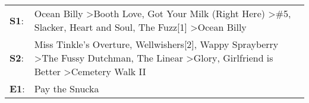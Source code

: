 \begin{supertabular}{p{0.03\textwidth}p{0.92\textwidth}}
 \textbf{S1}:  &                              Ocean Billy\textsuperscript{} \textgreater \enspace Booth Love\textsuperscript{}, \enspace Got Your Milk (Right Here)\textsuperscript{} \textgreater \enspace \#5\textsuperscript{}, \enspace Slacker\textsuperscript{}, \enspace Heart and Soul\textsuperscript{}, \enspace The Fuzz[1]\textsuperscript{} \textgreater \enspace Ocean Billy\textsuperscript{}  \enspace  \\
 \textbf{S2}:  &  Miss Tinkle's Overture\textsuperscript{}, \enspace Wellwishers[2]\textsuperscript{}, \enspace Wappy Sprayberry\textsuperscript{} \textgreater \enspace The Fussy Dutchman\textsuperscript{}, \enspace The Linear\textsuperscript{} \textgreater \enspace Glory\textsuperscript{}, \enspace Girlfriend is Better\textsuperscript{} \textgreater \enspace Cemetery Walk II\textsuperscript{}  \enspace  \\
 \textbf{E1}:  &                                                                                                                                                                                                                                                                                                                                                            Pay the Snucka\textsuperscript{}  \enspace  \\
\end{supertabular}
